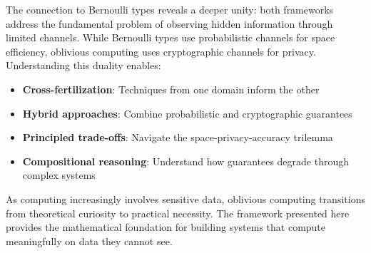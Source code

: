 \documentclass[11pt,final,hidelinks]{article}
\begin{document}
The connection to Bernoulli types reveals a deeper unity: both frameworks address the fundamental problem of observing hidden information through limited channels. While Bernoulli types use probabilistic channels for space efficiency, oblivious computing uses cryptographic channels for privacy. Understanding this duality enables:

\begin{itemize}
    \item \textbf{Cross-fertilization}: Techniques from one domain inform the other
    \item \textbf{Hybrid approaches}: Combine probabilistic and cryptographic guarantees
    \item \textbf{Principled trade-offs}: Navigate the space-privacy-accuracy trilemma
    \item \textbf{Compositional reasoning}: Understand how guarantees degrade through complex systems
\end{itemize}

As computing increasingly involves sensitive data, oblivious computing transitions from theoretical curiosity to practical necessity. The framework presented here provides the mathematical foundation for building systems that compute meaningfully on data they cannot see.


\end{document}
